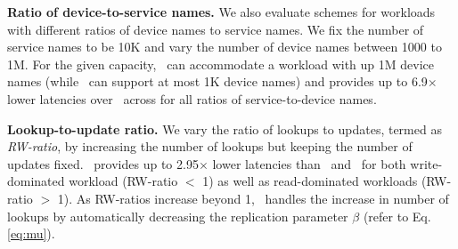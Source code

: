 {\textbf{Ratio of device-to-service names.} We also evaluate schemes for workloads with different ratios of device names to service names. We fix the number of service names to be 10K and vary the number of device names between 1000 to 1M.
For the given capacity, \auspice\  can accommodate a workload with up 1M device names (while \replicateall\ can support at most 1K device names) and provides up to 6.9$\times$ lower latencies over \staticthree\  across for all ratios of service-to-device names.


\textbf{Lookup-to-update ratio.} We vary the ratio of lookups to updates, termed as \emph{RW-ratio}, by increasing the number of lookups but keeping the number of updates fixed. \auspice\ provides up to 2.95$\times$ lower latencies than \codons\ and \staticthree\ for both write-dominated workload (RW-ratio $<$ 1) as well as read-dominated workloads (RW-ratio  $>$ 1). As RW-ratios increase beyond 1,  \auspice\ handles the increase in number of lookups  by automatically decreasing the replication parameter $\beta$ (refer to Eq. \ref{eq:mu}).

}



